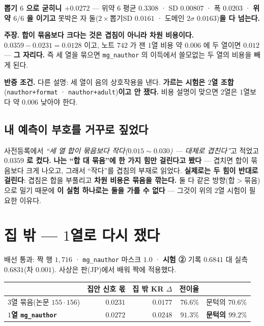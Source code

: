 \documentclass[10pt,a4paper]{article}
\newcommand{\claim}[2]{\begin{claimbox}\textbf{주장.} #1\par\smallskip
  \textcolor{gray!70}{\textbf{반증 조건.} #2}\end{claimbox}}
\begin{document}
\textbf{뽑기 $6$ 으로 굳히니 $\mathbf{+0.0272}$} --- 위약 $6$ 평균 $0.3308$ · SD
$0.00807$ · 폭 $0.0203$ · \textbf{위약 $6/6$ 을 이기고} 못박은 자 둘($2\times$뽑기SD
$0.0161$ · 도메인 $2\sigma$ $0.0163$)\textbf{을 다 넘는다.}

\claim{\textbf{합이 묶음보다 크다는 것은 겹침이 아니라 차원 비용이다.}
$0.0359 - 0.0231 = 0.0128$ 이고, 노트 $742$ 가 잰 $1$열 비용 약 $0.006$ 에 두 열이면
$0.012$ --- \textbf{그 자리다.} 즉 세 열을 묶으면 \texttt{mg\_nauthor} 의 이득에서
쓸모없는 두 열의 비용을 빼게 된다.}
{다른 설명: 세 열이 음의 상호작용을 낸다. \textbf{가르는 시험은 $2$열 조합}
(\texttt{nauthor+format} · \texttt{nauthor+adult})\textbf{이고 안 쟀다.} 비용 설명이
맞으면 $2$열은 $1$열보다 약 $0.006$ 낮아야 한다.}

\subsection*{내 예측이 부호를 거꾸로 짚었다}

사전등록에서 \emph{``세 열 합이 묶음보다 작다($0.015 \sim 0.030$) --- 대체로
겹친다''}고 적었고 \textbf{$0.0359$ 로 컸다.} \textbf{나는 ``합 대 묶음''에 한 가지 힘만 걸린다고 봤다} ---
겹치면 합이 묶음보다 크게 나오고, 그래서 ``작다''를 겹침의 부재로 읽었다.
\textbf{실제로는 두 힘이 반대로 걸린다}: 겹침은 합을 부풀리고
\textbf{차원 비용은 묶음을 깎는다.} 둘 다 같은 방향($합 > 묶음$)으로 밀기 때문에
\textbf{이 실험 하나로는 둘을 가를 수 없다} --- 그것이 위의 $2$열 시험이 필요한 이유다.

\section{집 밖 --- $1$열로 다시 쟀다}

배선 통과: 짝 행 $1{,}716$ · \texttt{mg\_nauthor} 마스크 $\mathbf{1.0}$ · \textbf{시험
②} 기록 $0.6841$ 대 실측 $0.6831$(차 $0.001$). 사상은 판(JP)에서 배워 짝에 적용했다.

\begin{center}
\begin{tabular}{lrrrl}
\toprule
& 집안 신호 몫 & 집 밖 KR $\Delta$ & \textbf{전이율} & \\
\midrule
$3$열 묶음(논문 $155 \cdot 156$) & $0.0231$ & $0.0177$ & $76.6\%$ & 문턱의 $70.6\%$ \\
\textbf{$1$열 \texttt{mg\_nauthor}} & $\mathbf{0.0272}$ & $\mathbf{0.0248}$ & $\mathbf{91.3\%}$ & \textbf{문턱의 $99.2\%$} \\
\bottomrule
\end{tabular}
\end{center}
\end{document}
